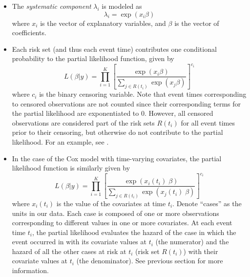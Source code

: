 \begin{itemize}
\item The \textit{systematic component} $\lambda_i$ is modeled as
\begin{equation*}
\lambda_i = \exp(x_i \beta)
\end{equation*}
where $x_i$ is the vector of explanatory variables, and $\beta$ is the vector of coefficients.

\item Each risk set (and thus each event time) contributes one conditional probability to the partial likelihood function, given by 
\begin{equation*}
L(\beta | y) = \prod_{i=1}^K \left[ \frac{\exp(x_i \beta)}{\sum_{j \in R(t_i)} \exp(x_j \beta)} \right] ^{c_i}
\end{equation*}  
where $c_i$ is the binary censoring variable.  Note that event times corresponding to censored observations are not counted since their corresponding terms for the partial likelihood are exponentiated to 0.  However, all censored observations are considered part of the risk sets $R(t_i)$ for all event times prior to their censoring, but otherwise do not contribute to the partial likelihood.  For an example, see \citet[53]{BoxJon04}.  

\item In the case of the Cox model with time-varying covariates, the partial likelihood function is similarly given by  
\begin{equation*}
L(\beta | y) = \prod_{i=1}^K \left[ \frac{\exp(x_i(t_i) \; \beta)}{\sum_{j \in R(t_i)} \exp(x_j(t_i) \; \beta)} \right] ^{c_i}
\end{equation*}  
where $x_i(t_i)$ is the value of the covariates at time $t_i$.  Denote ``cases'' as the units in our data.  Each case is composed of one or more observations corresponding to different values in one or more covariates.  At each event time $t_i$, the partial likelihood evaluates the hazard of the case in which the event occurred in with its covariate values at $t_i$ (the numerator) and the hazard of all the other cases at risk at $t_i$ (risk set $R(t_i)$) with their covariate values at $t_i$ (the denominator).  See previous section for more information. 



\end{itemize}
